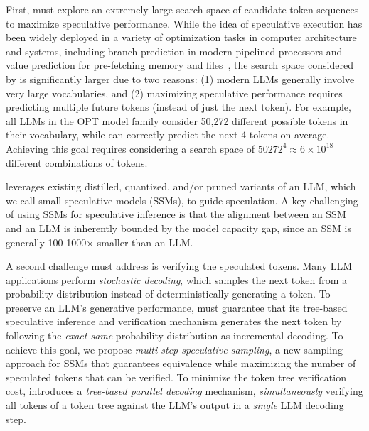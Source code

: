 First, \sys must explore an extremely large search space of candidate token sequences to maximize speculative performance. While the idea of speculative execution has been widely deployed in a variety of optimization tasks in computer architecture and systems, including branch prediction in modern pipelined processors and value prediction for pre-fetching memory and files~\cite{gabbay1996speculative, smith1998study}, the search space considered by \sys is significantly larger due to two reasons:
(1) modern LLMs generally involve very large vocabularies, and (2) maximizing speculative performance requires predicting multiple future tokens (instead of just the next token). For example, all LLMs in the OPT model family consider 50,272 different possible tokens in their vocabulary, while \sys can correctly predict the next 4 tokens on average. Achieving this goal requires considering a search space of $50272^4\approx6\times 10^{18}$ different combinations of tokens. 

\sys leverages existing distilled, quantized, and/or pruned variants of an LLM, which we call small speculative models (SSMs), to guide speculation. 
%
A key challenging of using SSMs for speculative inference is that the alignment between an SSM and an LLM is inherently bounded by the model capacity gap, since an SSM is generally 100-1000$\times$ smaller than an LLM.
%
%


A second challenge \Sys must address is verifying the speculated tokens. Many LLM applications perform {\em stochastic decoding}, which samples the next token from a probability distribution instead of deterministically generating a token. 
To preserve an LLM's generative performance, \Sys must guarantee that its tree-based speculative inference and verification mechanism generates the next token by following the {\em exact same} probability distribution as incremental decoding.
To achieve this goal, we propose {\em multi-step speculative sampling}, a new sampling approach for SSMs that guarantees equivalence while maximizing the number of speculated tokens that can be verified.
To minimize the token tree verification cost, \sys introduces a {\em tree-based parallel decoding} mechanism, {\em simultaneously} verifying all tokens of a token tree against the LLM's output in a {\em single} LLM decoding step.

